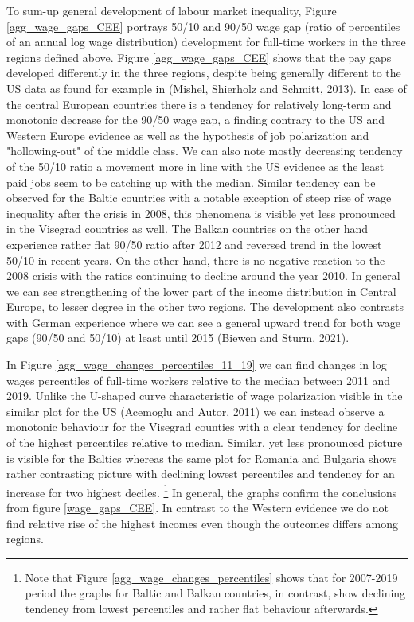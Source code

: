 \documentclass{article}
\begin{document}
To sum-up general development of labour market inequality, Figure \ref{agg_wage_gaps_CEE} portrays 50/10 and 90/50 wage gap (ratio of percentiles of an annual log wage distribution) development for full-time workers in the three regions defined above.
Figure \ref{agg_wage_gaps_CEE} shows that the pay gaps developed differently in the three regions, despite being generally different to the US data as found for example in (Mishel, Shierholz and Schmitt, 2013). In case of the central European countries there is a tendency for relatively long-term and monotonic decrease for the 90/50 wage gap, a finding contrary to the US and Western Europe evidence as well as the hypothesis of job polarization and "hollowing-out" of the middle class. We can also note mostly decreasing tendency of the 50/10 ratio a movement more in line with the US evidence as the least paid jobs seem to be catching up with the median. Similar tendency can be observed for the Baltic countries with a notable exception of steep rise of wage inequality after the crisis in 2008, this phenomena is visible yet less pronounced in the Visegrad countries as well. The Balkan countries on the other hand experience rather flat 90/50 ratio after 2012 and reversed trend in the lowest 50/10 in recent years. On the other hand, there is no negative reaction to the 2008 crisis with the ratios continuing to decline around the year 2010.
In general we can see strengthening of the lower part of the income distribution in Central Europe, to lesser degree in the other two regions. The development also contrasts with German experience where we can see a general upward trend for both wage gaps (90/50 and 50/10) at least until 2015 (Biewen and Sturm, 2021).


In Figure \ref{agg_wage_changes_percentiles_11_19} we can find changes in log wages percentiles of full-time workers relative to the median between 2011 and 2019. Unlike the U-shaped curve characteristic of wage polarization visible in the similar plot for the US (Acemoglu and Autor, 2011) we can instead observe a monotonic behaviour for the Visegrad counties with a clear tendency for decline of the highest percentiles relative to median. Similar, yet less pronounced picture is visible for the Baltics whereas the same plot for Romania and Bulgaria shows rather contrasting picture with declining lowest percentiles and tendency for an increase for two highest deciles.
\footnote{Note that Figure \ref{agg_wage_changes_percentiles} shows that for 2007-2019 period the graphs for Baltic and Balkan countries, in contrast, show declining tendency from lowest percentiles and rather flat behaviour afterwards.} In general, the graphs confirm the conclusions from figure \ref{wage_gaps_CEE}. In contrast to the Western evidence we do not find relative rise of the highest incomes even though the outcomes differs among regions.
\end{document}
